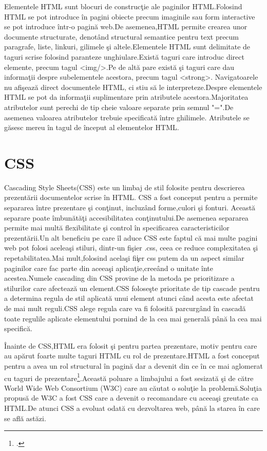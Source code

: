 \documentclass[a4paper,12pt]{report}
\begin{document}
Elementele HTML sunt blocuri de construc\c tie ale paginilor HTML.Folosind HTML se pot introduce \^in pagini obiecte precum imaginile
sau form interactive se pot introduce \^intr-o pagin\u a web.De asemenea,HTML permite crearea unor documente structurate, denot\^and
structural semantice pentru text precum paragrafe, liste, linkuri, gilimele \c si altele.Elementele HTML sunt delimitate de taguri
scrise folosind paranteze unghiulare.Exist\u a taguri care introduc direct elemente, precum tagul <img/>.Pe de alt\u a
pare exist\u a \c si taguri care dau informa\c tii despre subelementele acestora, precum tagul <strong>.
Navigatoarele nu afi\c seaz\u a direct documentele HTML, ci stiu s\u a le interpreteze.Despre elementele 
HTML se pot da informa\c tii suplimentare prin atributele acestora.Majoritatea atributelor sunt perechi
de tip cheie valoare separate prin semnul "=".De asemenea valoarea atributelor trebuie specificat\u a \^intre ghilimele.
Atributele se g\u asesc mereu \^in tagul de \^inceput al elementelor HTML.

\section{CSS}

Cascading Style Sheets(CSS) este un limbaj de stil folosite pentru descrierea prezent\u arii documentelor scrise \^in HTML.
CSS a fost conceput pentru a permite separarea \^intre prezentare \c si con\c tinut, incluz\^and forme,culori \c si fonturi.
Aceast\u a separare poate \^imbun\u at\u a\c ti accesibilitatea con\c tinutului.De asemenea separarea permite mai mult\u a 
flexibilitate \c si control \^in specificarea caracteristicilor prezent\u arii.Un alt beneficiu pe care \^il aduce CSS este 
faptul c\u a mai multe pagini web pot folosi acelea\c si stiluri, dintr-un fi\c sier .css, ceea ce reduce complexitatea
\c si repetabilitatea.Mai mult,folosind acela\c si fi\c ier css putem  da un aspect similar paginilor care fac parte din 
aceea\c si aplica\c tie,cree\^and o unitate \^inte acestea.Numele cascading din CSS provine de la metoda pe prioritizare 
a stilurilor care afecteaz\u a un element.CSS folose\c ste prioritate de tip cascade pentru a determina regula de stil aplicat\u a 
unui element atunci c\^and acesta este afectat de mai mult reguli.CSS alege regula care va fi folosit\u a parcurg\^and \^in cascad\u a toate
regulile aplicate elementului pornind de la cea mai general\u a p\^an\u a la cea mai specific\u a. 

\^Inainte de CSS,HTML era folosit \c si pentru partea prezentare, motiv pentru care au ap\u arut foarte multe taguri HTML
cu rol de prezentare.HTML a fost conceput pentru a avea un rol structural \^in pagin\u a dar a devenit din ce \^in ce mai 
aglomerat cu taguri de prezentare\footcite{cssDef}.Aceast\u a poluare a limbajului a fost sesizat\u a \c si de c\u atre World Wide Web Consortium (W3C)
care au c\u autat o solu\c tie la problem\u a.Solu\c tia propus\u a de W3C a fost CSS care a devenit o recomandare cu aceea\c si greutate
ca HTML.De atunci CSS a evoluat odat\u a cu dezvoltarea web, p\^an\u a la starea \^in care se afl\u a ast\u azi.
\end{document}
